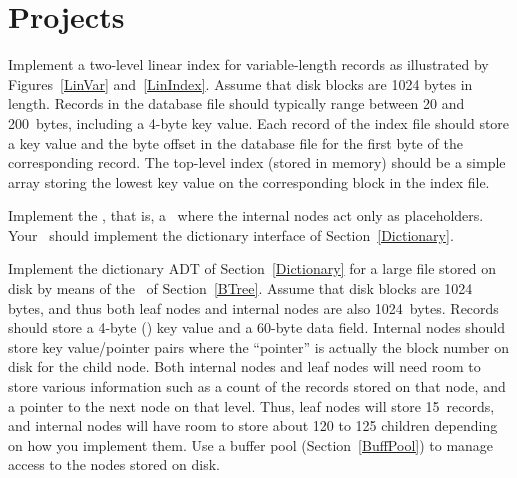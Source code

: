 \section{Projects}

\begin{projects}

\item
Implement a two-level linear index for variable-length records as
illustrated by Figures~\ref{LinVar}
and~\ref{LinIndex}.
Assume that disk blocks are 1024 bytes in length.
Records in the database file should typically range between 20 and
200~bytes, including a 4-byte key value.
Each record of the index file should store a key value and the byte
offset in the database file for the first byte of the corresponding
record.
The top-level index (stored in memory) should be a simple array
storing the lowest key value on the corresponding block in the index
file.

\item
Implement the \TTPtree, that is, a \TTtree\ where the internal nodes
act only as placeholders.
Your \TTPtree\ should implement the dictionary interface of
Section~\ref{Dictionary}.

\item
Implement the dictionary ADT of Section~\ref{Dictionary} for a large
file stored on disk by means of the \BPtree\ of Section~\ref{BTree}.
Assume that disk blocks are 1024 bytes, and thus both leaf nodes and
internal nodes are also
1024~bytes.
Records should store a 4-byte () key value and a 60-byte
data field.
Internal nodes should store key value/pointer pairs where the
``pointer'' is actually the block number on disk for the child node.
Both internal nodes and leaf nodes will need room to store various
information such as a count of the records stored on that node, and a
pointer to the next node on that level.
Thus, leaf nodes will store 15~records, and internal nodes will
have room to store about 120 to 125 children depending on how you
implement them.
Use a buffer pool (Section~\ref{BuffPool})
to manage access to the nodes stored on disk.

\end{projects}
